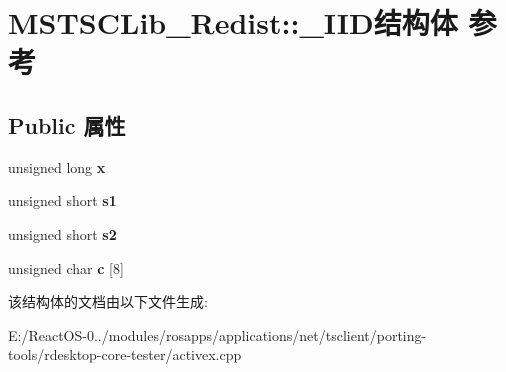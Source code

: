 \hypertarget{struct_m_s_t_s_c_lib___redist_1_1___i_i_d}{}\section{M\+S\+T\+S\+C\+Lib\+\_\+\+Redist\+:\+:\+\_\+\+I\+I\+D结构体 参考}
\label{struct_m_s_t_s_c_lib___redist_1_1___i_i_d}
\subsection*{Public 属性}
\begin{DoxyCompactItemize}
\item 
\mbox{\label{struct_m_s_t_s_c_lib___redist_1_1___i_i_d_a774febb71030b7cae19722e659edea62}} 
unsigned long {\bfseries x}
\item 
\mbox{\label{struct_m_s_t_s_c_lib___redist_1_1___i_i_d_a971358c50453fe31b32aa4189b525583}} 
unsigned short {\bfseries s1}
\item 
\mbox{\label{struct_m_s_t_s_c_lib___redist_1_1___i_i_d_a8a08a5898e451267ff638c89b52f6894}} 
unsigned short {\bfseries s2}
\item 
\mbox{\label{struct_m_s_t_s_c_lib___redist_1_1___i_i_d_ae5d0dd75bbfd59d821f8ddcf601c7433}} 
unsigned char {\bfseries c} \mbox{[}8\mbox{]}
\end{DoxyCompactItemize}


该结构体的文档由以下文件生成\+:\begin{DoxyCompactItemize}
\item 
E\+:/\+React\+O\+S-\/0../modules/rosapps/applications/net/tsclient/porting-\/tools/rdesktop-\/core-\/tester/activex.\+cpp\end{DoxyCompactItemize}
